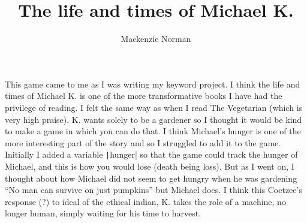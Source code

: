 \documentclass{article}
\title{The life and times of Michael K.}
\author{Mackenzie Norman}
\begin{document}
\maketitle
This game came to me as I was writing my keyword project. I think the life and times of Michael K. is one of the more transformative books I have had the privilege of reading. I felt the same way as when I read The Vegetarian (which is very high praise).
K. wants solely to be a gardener so I thought it would be kind to make a game in which you can do that. I think Michael's hunger is one of the more interesting part of the story and so I struggled to add it to the game. Initially I added a variable \texttt|hunger| so that the game could track the hunger of Michael, and this is how you would lose (death being loss). But as I went on, I thought about how Michael did not seem to get hungry when he was gardening ``No man can survive on just pumpkins'' but Michael does.
I think this Coetzee's response (?) to ideal of the ethical indian, K. takes the role of a machine, no longer human, simply waiting for his time to harvest. 
\end{document}
